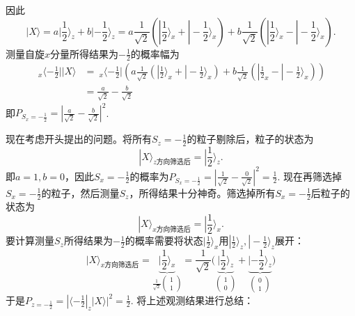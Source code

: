因此
\begin{equation}
	|X\rangle = a|\frac{1}{2}\rangle_z + b |-\frac{1}{2} \rangle_z = a\frac{1}{\sqrt{2}} \left( |\frac{1}{2} \rangle_x + |-\frac{1}{2} \rangle_x \right) + b \frac{1}{\sqrt{2}} \left( |\frac{1}{2} \rangle_x - |-\frac{1}{2} \rangle_x \right).
\label{equ8.53}
\end{equation}
测量自旋$x$分量所得结果为$-\frac{1}{2}$的概率幅为
\begin{equation}
\begin{split}
	\ _x \langle -\frac{1}{2} || X \rangle &= \ _x \langle -\frac{1}{2} | \left( a\frac{1}{\sqrt{2}} \left( |\frac{1}{2} \rangle_x + |-\frac{1}{2} \rangle_x \right) + b\frac{1}{\sqrt{2}} \left( |\frac{1}{2}_x - |-\frac{1}{2} \rangle_x \right) \right) \\
	&= \frac{a}{\sqrt{2}} - \frac{b}{\sqrt{2}}
\label{equ8.54}
\end{split}
\end{equation}
即$P_{S_x = -\frac{1}{2}} = |\frac{a}{\sqrt{2}} - \frac{b}{\sqrt{2}}|^2$.

现在考虑开头提出的问题。将所有$S_z = -\frac{1}{2}$的粒子剔除后，粒子的状态为
\begin{equation}
	|X\rangle_{z\text{方向筛选后}} = |\frac{1}{2} \rangle_z.
\label{equ8.55}
\end{equation}
即$a = 1, b = 0$，因此$S_x = -\frac{1}{2}$的概率为$P_{S_x = -\frac{1}{2}} = |\frac{1}{\sqrt{2}} - \frac{0}{\sqrt{2}}|^2 = \frac{1}{2}$. 现在再筛选掉$S_x = -\frac{1}{2}$的粒子，然后测量$S_z$，所得结果十分神奇。筛选掉所有$S_x = -\frac{1}{2}$后粒子的状态为
\begin{equation}
	|X \rangle_{x\text{方向筛选后}} = |\frac{1}{2} \rangle_x.
\label{equ8.56}
\end{equation}
要计算测量$S_z$所得结果为$-\frac{1}{2}$的概率需要将状态$|\frac{1}{2} \rangle_x$用$|\frac{1}{2} \rangle_z, |-\frac{1}{2} \rangle_z$展开：
\begin{equation}
	|X \rangle_{x\text{方向筛选后}} = \underbrace{ |\frac{1}{2} \rangle_x }_{\frac{1}{\sqrt{2}} \begin{pmatrix} 1 \\ 1 \end{pmatrix} } = \frac{1}{\sqrt{2}} \Big(  \underbrace{ |\frac{1}{2} \rangle_z}_{ \begin{pmatrix} 1 \\ 0 \end{pmatrix}} + \underbrace{|-\frac{1}{2} \rangle_z}_{\begin{pmatrix} 0 \\ 1 \end{pmatrix}} \Big)
\label{equ8.57}
\end{equation}
于是$P_{z = -\frac{1}{2}} = | \langle -\frac{1}{2} |_z |X\rangle|^2 = \frac{1}{2}$. 将上述观测结果进行总结：

